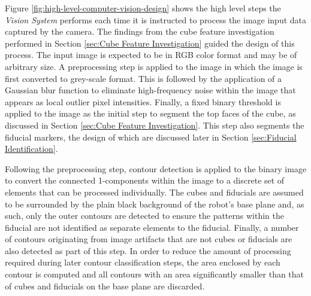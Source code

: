 Figure \ref{fig:high-level-computer-vision-design} shows the high level steps the \textit{Vision System} performs each time it is instructed to process the image input data captured by the camera. The findings from the cube feature investigation performed in Section \ref{sec:Cube Feature Investigation} guided the design of this process. The input image is expected to be in RGB color format and may be of arbitrary size.  A preprocessing step is applied to the image in which the image is first converted to grey-scale format. This is followed by the application of a Gaussian blur function to eliminate high-frequency noise within the image that appears as local outlier pixel intensities. Finally, a fixed binary threshold is applied to the image as the initial step to segment the top faces of the cube, as discussed in Section \ref{sec:Cube Feature Investigation}. This step also segments the fiducial markers, the design of which are discussed later in Section \ref{sec:Fiducial Identification}.

Following the preprocessing step, contour detection is applied to the binary image to convert the connected 1-components within the image to a discrete set of elements that can be processed individually. The cubes and fiducials are assumed to be surrounded by the plain black background of the robot's base plane and, as such, only the outer contours are detected to ensure the patterns within the fiducial are not identified as separate elements to the fiducial. Finally, a number of contours originating from image artifacts that are not cubes or fiducials are also detected as part of this step. In order to reduce the amount of processing required during later contour classification steps, the area enclosed by each contour is computed and all contours with an area significantly smaller than that of cubes and fiducials on the base plane are discarded.


